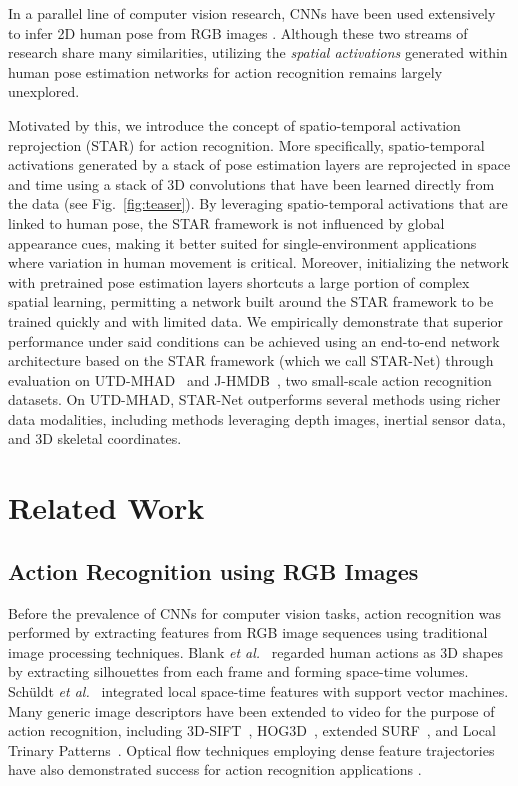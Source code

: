 \documentclass[10pt, conference, compsocconf]{IEEEtran}
\begin{document}
In a parallel line of computer vision research, CNNs have been used extensively to infer 2D human pose from RGB images \cite{newell2016stacked, cao2017realtime, chen2017cascaded}. Although these two streams of research share many similarities, utilizing the \textit{spatial activations} generated within human pose estimation networks for action recognition remains largely unexplored. 

Motivated by this, we introduce the concept of spatio-temporal activation reprojection (STAR) for action recognition.  More specifically,  spatio-temporal activations generated by a stack of pose estimation layers are reprojected in space and time using a stack of 3D convolutions that have been learned directly from the data (see Fig.~\ref{fig:teaser}). By leveraging spatio-temporal activations that are linked to human pose, the STAR framework is not influenced by global appearance cues, making it better suited for single-environment applications where variation in human movement is critical. Moreover, initializing the network with pretrained pose estimation layers shortcuts a large portion of complex spatial learning, permitting a network built around the STAR framework to be trained quickly and with limited data.  We empirically demonstrate that superior performance under said conditions can be achieved using an end-to-end network architecture based on the STAR framework (which we call STAR-Net) through evaluation on UTD-MHAD~\cite{chen2015utd} and J-HMDB~\cite{jhuang2013towards}, two small-scale action recognition datasets. On UTD-MHAD, STAR-Net outperforms several methods using richer data modalities, including methods leveraging depth images, inertial sensor data, and 3D skeletal coordinates. 

\section{Related Work}

\subsection{Action Recognition using RGB Images} 

Before the prevalence of CNNs for computer vision tasks, action recognition was performed by extracting features from RGB image sequences using traditional image processing techniques. Blank \textit{et al.}~\cite{blank2005actions} regarded human actions as 3D shapes by extracting silhouettes from each frame and forming space-time volumes. Sch\"uldt \textit{et al.}~\cite{schuldt2004recognizing} integrated local space-time features with support vector machines. Many generic image descriptors have been extended to video for the purpose of action recognition, including 3D-SIFT~\cite{scovanner20073}, HOG3D~\cite{klaser2008spatio}, extended SURF~\cite{willems2008efficient}, and Local Trinary Patterns~\cite{yeffet2009local}. Optical flow techniques employing dense feature trajectories have also demonstrated success for action recognition applications \cite{wang2013action}.
\end{document}
